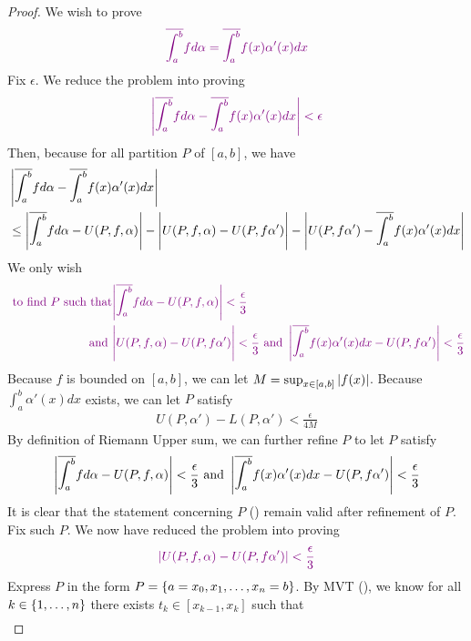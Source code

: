 \documentclass{report}
\begin{document}
\begin{proof}
We wish to prove 
\begin{align*}  \textcolor{violet}{\overline{\int_a^b}fd\alpha = \overline{\int_a^b} f(x)\alpha '(x)dx}
\end{align*}
Fix $\epsilon $. We reduce the problem into proving 
\begin{align*}  \textcolor{violet}{\left|\overline{\int_a^b}fd\alpha -\overline{\int_a^b}f(x)\alpha '(x)dx\right|<\epsilon }
\end{align*}
Then, because for all partition $P$ of  $[a,b]$, we have 
\begin{align*}  &\left|\overline{\int_a^b}fd\alpha - \overline{\int_a^b}f(x)\alpha '(x)dx\right|\\
  &\leq \left|\overline{\int_a^b} fd\alpha -U(P,f,\alpha )\right|-\Bigg|U(P,f,\alpha )-U(P,f\alpha' )\Bigg|-\left|U(P,f\alpha' )- \overline{\int_a^b} f(x)\alpha '(x)dx\right|
\end{align*}
We only wish 
\begin{align*}
\textcolor{violet}{\text{  to find $P$ such that}}&\textcolor{violet}{\left|\overline{\int_a^b}fd\alpha - U(P,f,\alpha )\right|<\frac{\epsilon}{3}}\\
\textcolor{violet}{\text{ and }}&\textcolor{violet}{\Bigg|U(P,f,\alpha )-U(P,f\alpha' )\Bigg|<\frac{\epsilon}{3}\text{ and }\left|\overline{\int_a^b}f(x)\alpha '(x)dx- U(P,f\alpha ')\right|<\frac{\epsilon}{3}}
\end{align*} 
Because $f$ is bounded on  $[a,b]$, we can let $M=\sup_{x \in [a,b]} \left|f(x)\right|$. Because $\int_a^b \alpha' (x)dx$ exists, we can let $P$ satisfy 
 \begin{align}
\label{CR3}
U(P,\alpha ')-L(P,\alpha ')<\frac{\epsilon }{4M}
\end{align}
By definition of Riemann Upper sum, we can further refine $P$ to let $P$ satisfy 
\begin{align*}
\left|\overline{\int_a^b}fd\alpha -U(P,f,\alpha )\right|<\frac{\epsilon}{3}\text{ and }\left|\overline{\int_a^b}f(x)\alpha '(x)dx- U(P,f\alpha ')\right|<\frac{\epsilon}{3}
\end{align*}
It is clear that the statement concerning $P$  () remain valid after refinement of $P$. Fix such $P$. We now have reduced the problem into proving 
\begin{align*}
  \textcolor{violet}{\left|U(P,f,\alpha )-U(P,f\alpha ')\right|<\frac{\epsilon}{3}}
\end{align*}
Express $P$ in the form $P=\{ a=x_0,x_1,\dots ,x_n=b \}$. By MVT (), we know for all $k \in \{ 1,\dots ,n \}$ there exists $t_k \in [x_{k-1},x_k]$ such that
\begin{align}

\end{align}
\end{proof}
\end{document}
